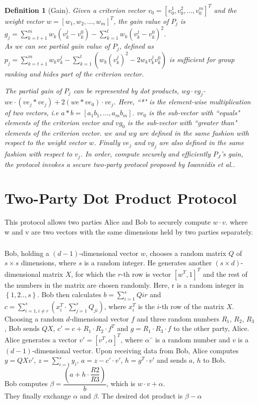 \documentclass[11pt, a4paper, oneside, openright]{book} %
\newtheorem{dfn}{Definition}
\begin{document}
\begin{dfn} [Gain]
Given a criterion vector $v_0 = [v_0^1, v_0^2,..., v_0^m]^T$ and the weight vector $w=[w_1,w_2,...,w_m]^T$, the gain value of $P_j$ is \\
$g_j = \sum_{k=t+1}^{m} w_k(v_k^{j} - v_k^0) - \sum_{k=1}^{t} w_{k}(v_{k}^j - v_k^0)^{2}$. \\
As we can see partial gain value of $P_j$, defined as $p_j =\sum_{k=t+1}^{m} w_kv_{k}^{j} - \sum_{k=1}^{t} (w_{k}(v_{k}^{j})^{2} - 2w_{k}v_{k}^{j}v_{k}^{0})$ is sufficient for group ranking and hides part of the criterion vector.


The partial gain of $P_j$ can be represented by dot products, $wg\cdot vg_j$-$we \cdot (ve_j*ve_j)+2(we*ve_0)\cdot ve_j$. Here, ``*" is the element-wise multiplication of two vectors, i.e  $a*b=[a_1b_1,...,a_mb_m]$. $ve_0$ is the sub-vector with ``equals" elements of the criterion vector and $vg_0$ is the sub-vector with ``greater than" elements of the criterion vector. $we$ and $wg$ are defined in the same fashion with respect to the weight vector $w$. Finally $ve_j$ and $vg_j$ are also defined in the same fashion with respect to $v_j$.
In order, compute securely and efficiently $P_J$'s gain, the protocol invokes a secure two-party protocol proposed by \textit{Ioannidis et al}.\cite{dotprod}.
\end{dfn}

\section{Two-Party Dot Product Protocol}
	This protocol allows two parties Alice and Bob to securely compute $w\cdot v$. where w and v are two vectors with the same dimensions held by two parties separately.
\subparagraph{}
Bob, holding a $(d-1)$-dimensional vector $w$, chooses a
random matrix $Q$ of $s\times s$ dimensions, where $s$ is a random
integer. He generates another $(s \times d)$-dimensional matrix
$X$, for which the $r$-th row is vector $[w^T, 1]^T$ and the
rest of the numbers in the matrix are chosen randomly.
Here, r is a random integer in $\left\lbrace 1,2.., s \right\rbrace$. Bob then calculates
$b = \sum_{i=1}^s Qir$ and $c =\sum_{
i=1,i\neq r}^s(x_i^T \cdot \sum_{j=1}^s Q_{ji})$, where $x_i^T$ is the $i$-th row of the matrix $X$.  Choosing a random $d$-dimensional
vector $f$ and three random numbers $R_1$, $R_2$,
$R_3$, Bob sends $QX$, $c' = c+R_1\cdot R_2 \cdot f^T$ and $g = R_1\cdot R_3 \cdot f$
to the other party, Alice.\\
Alice generates a vector $v' = [v^T, \alpha]^T$, where $\alpha¨$ is a random
number and $v$ is a $(d - 1)$-dimensional vector. Upon
receiving data from Bob, Alice computes $y = QXv'$, $z = \sum_{i=1}^s y_i$, $a = z- c'\cdot v'$, $h=g^T \cdot v'$  and sends $a$, $h$
to Bob.\\
Bob computes $\beta = \dfrac{(a + h\cdot \dfrac{R2}{R3})}{b}$, which is $w\cdot v + \alpha$.\\
They finally exchange $\alpha$ and $\beta$. The desired dot product
is $\beta - \alpha$
\end{document}
